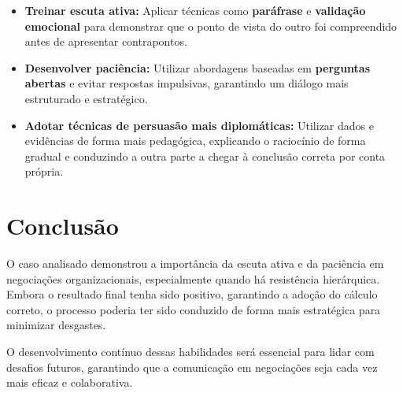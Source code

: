 \documentclass[11pt]{article}
\begin{document}
\begin{itemize}
\item \textbf{Treinar escuta ativa:} Aplicar técnicas como \textbf{paráfrase} e \textbf{validação emocional} para demonstrar que o ponto de vista do outro foi compreendido antes de apresentar contrapontos.
\item \textbf{Desenvolver paciência:} Utilizar abordagens baseadas em \textbf{perguntas abertas} e evitar respostas impulsivas, garantindo um diálogo mais estruturado e estratégico.
\item \textbf{Adotar técnicas de persuasão mais diplomáticas:} Utilizar dados e evidências de forma mais pedagógica, explicando o raciocínio de forma gradual e conduzindo a outra parte a chegar à conclusão correta por conta própria.
\end{itemize}
\section*{Conclusão}
\label{sec:orge44ff6f}
O caso analisado demonstrou a importância da escuta ativa e da paciência em negociações organizacionais, especialmente quando há resistência hierárquica. Embora o resultado final tenha sido positivo, garantindo a adoção do cálculo correto, o processo poderia ter sido conduzido de forma mais estratégica para minimizar desgastes.

O desenvolvimento contínuo dessas habilidades será essencial para lidar com desafios futuros, garantindo que a comunicação em negociações seja cada vez mais eficaz e colaborativa.
\end{document}
